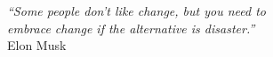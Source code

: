 \cleardoublepage
\thispagestyle{plain}

\vspace*{8cm}

\begin{flushright}
   \textsl{``Some people don't like change, but you need to \\
   	 embrace change if the alternative is disaster.''} \\
\vspace*{1.5cm}
           Elon Musk
\end{flushright}
